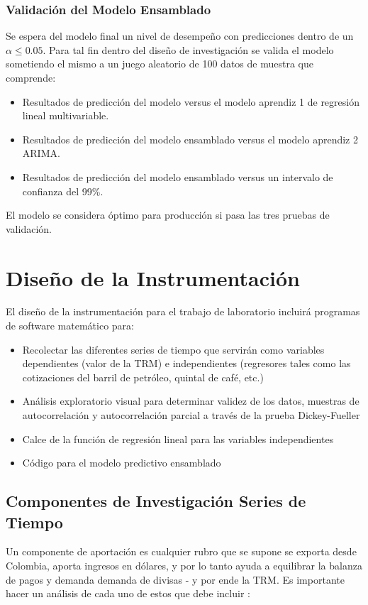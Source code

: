 \begin{spacing}{1.5}
\subsubsection{Validación del Modelo Ensamblado}
Se espera del modelo final un nivel de desempeño con predicciones dentro de un \(\alpha \leq 0.05\). Para tal fin dentro del diseño de investigación se valida el modelo sometiendo el mismo a un juego aleatorio de 100 datos de muestra que comprende:

\begin{itemize}
	\item Resultados de predicción del modelo versus el modelo aprendiz 1 de regresión lineal multivariable.
	\item Resultados de predicción del modelo ensamblado versus el modelo aprendiz 2 ARIMA. 
	\item Resultados de predicción del modelo ensamblado versus un intervalo de confianza del 99\%.
\end{itemize}

El modelo se considera óptimo para producción si pasa las tres pruebas de validación.  

\section{Diseño de la Instrumentación}
El diseño de la instrumentación para el trabajo de laboratorio incluirá programas de software matemático para:

\begin{itemize}
    \item Recolectar las diferentes series de tiempo que servirán como variables dependientes (valor de la TRM) e independientes (regresores tales como las cotizaciones del barril de petróleo, quintal de café, etc.)
    \item Análisis exploratorio visual para determinar validez de los datos, muestras de autocorrelación y autocorrelación parcial a través de la prueba Dickey-Fueller
    \item Calce de la función de regresión lineal para las variables independientes
    \item Código para el modelo predictivo ensamblado
\end{itemize}

\subsection{Componentes de Investigación Series de Tiempo}
Un componente de aportación es cualquier rubro que se supone se exporta desde Colombia, aporta ingresos en dólares, y por lo tanto ayuda a equilibrar la balanza de pagos y demanda demanda de divisas - y por ende la TRM. Es importante hacer un análisis de cada uno de estos que debe incluir \cite{zumelMount}:


\end{spacing}
